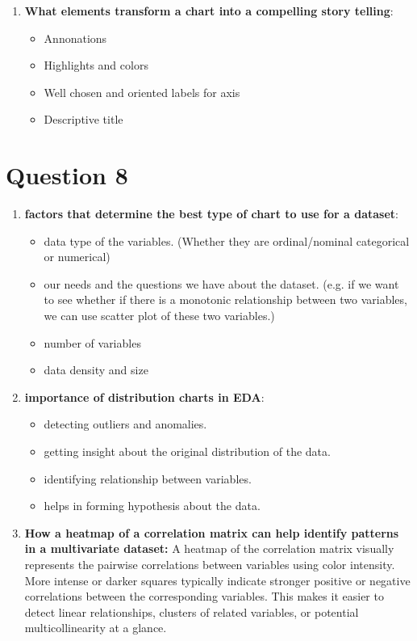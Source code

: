 \documentclass[a4paper,12pt]{article}
\begin{document}
\begin{enumerate}
    \item \textbf{What elements transform a chart into a compelling story telling}:
    \begin{itemize}
        \item Annonations 
        \item Highlights and colors
        \item Well chosen and oriented labels for axis
        \item Descriptive title
    \end{itemize}
\end{enumerate}

\section*{Question 8}
\begin{enumerate}
    \item \textbf{factors that determine the best type of chart to use for a dataset}:
    \begin{itemize}
        \item data type of the variables. (Whether they are ordinal/nominal categorical or numerical)
        \item our needs and the questions we have about the dataset. (e.g. if we want to see whether if there is a monotonic relationship between two variables, we can use scatter plot of these two variables.)
        \item number of variables
        \item data density and size
    \end{itemize}
    \item \textbf{importance of distribution charts in EDA}:
    \begin{itemize}
        \item detecting outliers and anomalies.
        \item getting insight about the original distribution of the data.
        \item identifying relationship between variables.
        \item helps in forming hypothesis about the data.
    \end{itemize}
    \item \textbf{How a heatmap of a correlation matrix can help identify patterns in a multivariate dataset:} A heatmap of the correlation matrix visually represents the pairwise correlations between variables using color intensity. More intense or darker squares typically indicate stronger positive or negative correlations between the corresponding variables. This makes it easier to detect linear relationships, clusters of related variables, or potential multicollinearity at a glance.
\end{enumerate}
\end{document}
